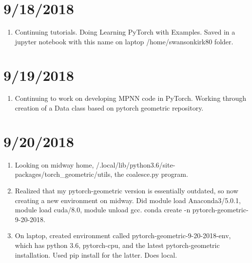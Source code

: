 \documentclass[12pt,reqno]{amsart}
\numberwithin{equation}{section}
\begin{document}
\section{9/18/2018}
\begin{enumerate}
\item Continuing tutorials.  Doing Learning PyTorch with Examples.  Saved in a jupyter notebook with this name on laptop /home/swansonkirk80 folder.  
\end{enumerate}

\section{9/19/2018}
\begin{enumerate}
\item Continuing to work on developing MPNN code in PyTorch.  Working through creation of a Data class based on pytorch geometric repository.
\end{enumerate}

\section{9/20/2018}
\begin{enumerate}
\item Looking on midway home, /.local/lib/python3.6/site-packages/torch\_geometric/utils, the coalesce.py program.  
\item Realized that my pytorch-geometric version is essentially outdated, so now creating a new environment on midway.  Did module load Anaconda3/5.0.1, module load cuda/8.0, module unload gcc.  conda create -n pytorch-geometric-9-20-2018.  
\item On laptop, created environment called pytorch-geometric-9-20-2018-env, which has python 3.6, pytorch-cpu, and the latest pytorch-geometric installation.  Used pip install for the latter.  Does local.  
\end{enumerate}



\normalsize

\end{document}
